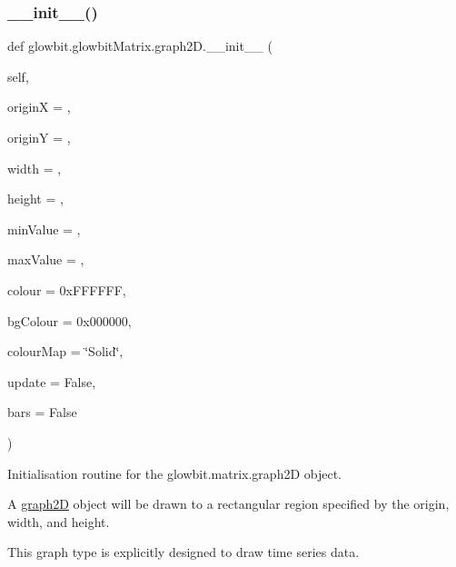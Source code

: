 \subsubsection{\texorpdfstring{\+\_\+\+\_\+init\+\_\+\+\_\+()}{\_\_init\_\_()}}
{\footnotesize\ttfamily def glowbit.\+glowbit\+Matrix.\+graph2\+D.\+\_\+\+\_\+init\+\_\+\+\_\+ (\begin{DoxyParamCaption}\item[{}]{self,  }\item[{}]{originX = {},  }\item[{}]{originY = {},  }\item[{}]{width = {},  }\item[{}]{height = {},  }\item[{}]{min\+Value = {},  }\item[{}]{max\+Value = {},  }\item[{}]{colour = {\ttfamily 0xFFFFFF},  }\item[{}]{bg\+Colour = {\ttfamily 0x000000},  }\item[{}]{colour\+Map = {\ttfamily \char`\"{}Solid\char`\"{}},  }\item[{}]{update = {\ttfamily False},  }\item[{}]{bars = {\ttfamily False} }\end{DoxyParamCaption})}



Initialisation routine for the glowbit.\+matrix.\+graph2D object. 

A \hyperlink{classglowbit_1_1glowbitMatrix_1_1graph2D}{graph2D} object will be drawn to a rectangular region specified by the origin, width, and height.

This graph type is explicitly designed to draw time series data.


